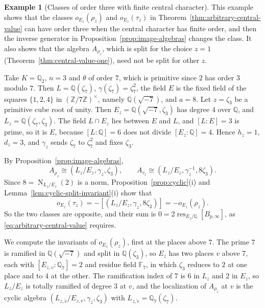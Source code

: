 \documentclass[a4paper,11pt]{amsart}
\theoremstyle{definition}
\newtheorem{example}[theorem]{Example}
\theoremstyle{remark}
\numberwithin{equation}{section}
\newcommand{\Q}{\mathbb{Q}}
\newcommand{\Z}{\mathbb{Z}}
\DeclareMathOperator{\res}{res}
\newcommand{\F}{\mathbb{F}}
\DeclareMathOperator{\Nm}{N}
\begin{document}
\begin{example}[Classes of order three with finite central character]
\label{ex:order-three}
This example shows that the classes $o_{E_z}(\rho_z)$ and $o_{E_z}(\tau_z)$ in Theorem~\ref{thm:arbitrary-central-value} can have order three when the central character has finite order, and then the inverse generator in Proposition~\ref{prop:image-algebras} changes the class. It also shows that the algebra $A_{\rho_z}$, which is split for the choice $z=1$ (Theorem~\ref{thm:central-value-one}), need not be split for other $z$.

Take $K=\Q_2$, $n=3$ and $\theta$ of order $7$, which is primitive since $2$ has order $3$ modulo $7$. Then $L=\Q(\zeta_7)$, $\gamma(\zeta_7)=\zeta_7^2$, the field $E$ is the fixed field of the squares $\{1,2,4\}$ in $(\Z/7\Z)^\times$, namely $\Q(\sqrt{-7})$, and $a=8$. Let $z=\zeta_3$ be a primitive cube root of unity. Then $E_z=\Q(\sqrt{-7},\zeta_3)$ has degree $4$ over $\Q$, and $L_z=\Q(\zeta_7,\zeta_3)$. The field $L\cap E_z$ lies between $E$ and $L$, and $[L:E]=3$ is prime, so it is $E$, because $[L:\Q]=6$ does not divide $[E_z:\Q]=4$. Hence $h_z=1$, $d_z=3$, and $\gamma_z$ sends $\zeta_7$ to $\zeta_7^2$ and fixes $\zeta_3$.

By Proposition~\ref{prop:image-algebras},
\[
 A_{\rho_z}\cong(L_z/E_z,\gamma_z,\zeta_3),\qquad A_{\tau_z}\cong(L_z/E_z,\gamma_z^{-1},8\zeta_3).
\]
Since $8=\Nm_{L_z/E_z}(2)$ is a norm, Proposition~\ref{prop:cyclic}(i) and Lemma~\ref{lem:cyclic-split-invariant}(i) show that
\[
 o_{E_z}(\tau_z)=-[(L_z/E_z,\gamma_z,8\zeta_3)]=-o_{E_z}(\rho_z).
\]
So the two classes are opposite, and their sum is $0=2\res_{E_z/\Q}[B_{p,\infty}]$, as \eqref{eq:arbitrary-central-value} requires.

We compute the invariants of $o_{E_z}(\rho_z)$, first at the places above $7$. The prime $7$ is ramified in $\Q(\sqrt{-7})$ and split in $\Q(\zeta_3)$, so $E_z$ has two places $v$ above $7$, each with $[E_{z,v}:\Q_7]=2$ and residue field $\F_7$, in which $\zeta_3$ reduces to $2$ at one place and to $4$ at the other. The ramification index of $7$ is $6$ in $L_z$ and $2$ in $E_z$, so $L_z/E_z$ is totally ramified of degree $3$ at $v$, and the localization of $A_{\rho_z}$ at $v$ is the cyclic algebra $(L_{z,\tilde v}/E_{z,v},\gamma_z,\zeta_3)$ with $L_{z,\tilde v}=\Q_7(\zeta_7)$.


\end{example}
\end{document}
